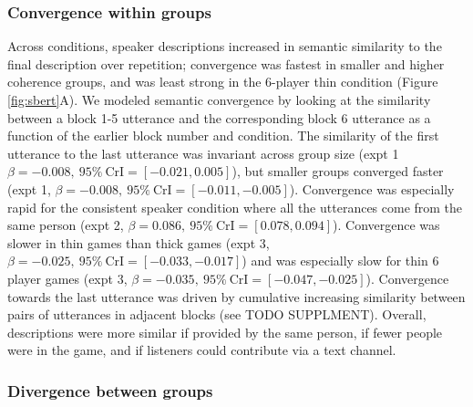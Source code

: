 \documentclass[
  english,
  a4paper,
]{article}
\begin{document}
\hypertarget{convergence-within-groups}{%
\subsubsection{Convergence within groups}\label{convergence-within-groups}}

Across conditions, speaker descriptions increased in semantic similarity to the final description over repetition; convergence was fastest in smaller and higher coherence groups, and was least strong in the 6-player thin condition (Figure \ref{fig:sbert}A). We modeled semantic convergence by looking at the similarity between a block 1-5 utterance and the corresponding block 6 utterance as a function of the earlier block number and condition. The similarity of the first utterance to the last utterance was invariant across group size (expt 1 \(\beta=-0.008,\:95\%\:\mathrm{CrI}=[-0.021, 0.005]\)), but smaller groups converged faster (expt 1, \(\beta=-0.008,\:95\%\:\mathrm{CrI}=[-0.011, -0.005]\)). Convergence was especially rapid for the consistent speaker condition where all the utterances come from the same person (expt 2, \(\beta=0.086,\:95\%\:\mathrm{CrI}=[0.078, 0.094]\)). Convergence was slower in thin games than thick games (expt 3, \(\beta=-0.025,\:95\%\:\mathrm{CrI}=[-0.033, -0.017]\)) and was especially slow for thin 6 player games (expt 3, \(\beta=-0.035,\:95\%\:\mathrm{CrI}=[-0.047, -0.025]\)). Convergence towards the last utterance was driven by cumulative increasing similarity between pairs of utterances in adjacent blocks (see TODO SUPPLMENT). Overall, descriptions were more similar if provided by the same person, if fewer people were in the game, and if listeners could contribute via a text channel.

\hypertarget{divergence-between-groups}{%
\subsubsection{Divergence between groups}\label{divergence-between-groups}}
\end{document}
